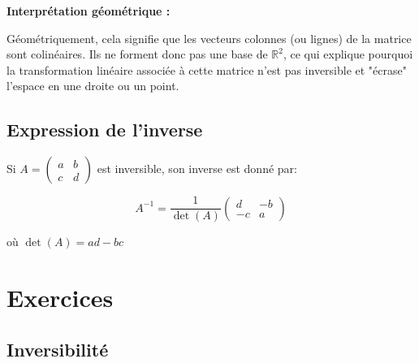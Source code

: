 \documentclass[10pt,a4paper]{article}
\begin{document}
\textbf{Interprétation géométrique :}

Géométriquement, cela signifie que les vecteurs colonnes (ou lignes) de la matrice sont colinéaires.
Ils ne forment donc pas une base de $\mathbb{R}^2$, ce qui explique pourquoi la transformation linéaire associée à cette matrice n'est pas inversible et "écrase" l'espace en une droite ou un point.


\subsection*{Expression de l'inverse}

Si $A = \begin{pmatrix} a & b \\ c & d \end{pmatrix}$ est inversible, son inverse est donné par:

$$A^{-1} = \frac{1}{\det(A)} \begin{pmatrix} d & -b \\ -c & a \end{pmatrix}$$

où $\det(A) = ad - bc$

\section*{Exercices}

\subsection*{Inversibilité}
\end{document}
